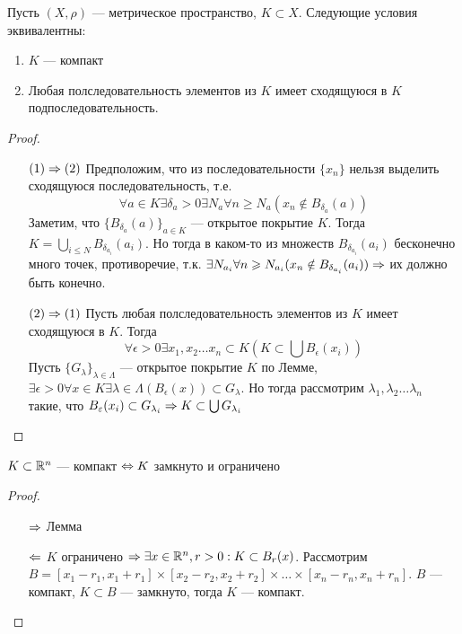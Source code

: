 \begin{theorem}
    Пусть \((X, \rho)\) --- метрическое пространство, \(K \subset X\). Следующие условия эквивалентны:
    \begin{enumerate}
        \item \(K\) --- компакт
        \item Любая полследовательность элементов из \(K\) имеет сходящуюся в \(K\) подпоследовательность.
    \end{enumerate}
\end{theorem}
\begin{proof}\indent
    \begin{enumerate}
        \item[\((1) \Rightarrow (2)\)] Предположим, что из последовательности \(\{x_n\}\) нельзя выделить сходящуюся последовательность, т.е. 
        \[\forall a \in K \exists \delta_a > 0 \exists N_a \forall n \ge N_{a} (x_n \notin B_{\delta_a}(a))\]
        Заметим, что \(\{B_{\delta_a}(a)\}_{a \in K}\) --- открытое покрытие \(K\). Тогда \(K = \bigcup_{i \le N} B_{\delta_{a_i}}(a_i)\). Но тогда в каком-то из множеств \(B_{\delta_{a_i}}(a_i)\) бесконечно много точек, противоречие, т.к. \(\exists N_{a_i} \forall n \geqslant N_{a_i} (x_n \notin B_{\delta_{a_i}}(a_i)) \Rightarrow\) их должно быть конечно.
        \item[\((2) \Rightarrow (1)\)] Пусть любая полследовательность элементов из \(K\) имеет сходящуюся в \(K\). Тогда 
        \[\forall \epsilon > 0 \exists x_1, x_2 \dots x_n \subset K (K \subset \bigcup B_\epsilon(x_i))\]
        Пусть \(\{G_\lambda\}_{\lambda \in \Lambda}\) --- открытое покрытие \(K\) по Лемме, \(\exists \epsilon > 0 \forall x \in K \exists \lambda \in \Lambda (B_\epsilon(x)) \subset G_\lambda\). Но тогда рассмотрим \(\lambda_1, \lambda_2 \dots \lambda_n\) такие, что \(B_{\varepsilon}(x_i) \subset G_{\lambda_i} \Rightarrow K \subset \bigcup G_{\lambda_i}\)
    \end{enumerate}
\end{proof}

\begin{corollary}
    \(K \subset \mathbb{R}^n\) --- компакт \(\Leftrightarrow K\) замкнуто и ограничено
\end{corollary}
\begin{proof}\indent
    \begin{enumerate}
        \item[\(\Rightarrow\)] Лемма
        \item[\(\Leftarrow\)] \(K\) ограничено \(\Rightarrow \exists x \in \mathbb{R}^n, r > 0: K \subset B_r(x)\). Рассмотрим \(B = [x_1 - r_1, x_1 + r_1] \times[x_2 - r_2, x_2 + r_2]\times\dots\times[x_n - r_n, x_n + r_n]\). \(B\) --- компакт, \(K \subset B\) --- замкнуто, тогда \(K\) --- компакт.
    \end{enumerate}
\end{proof}